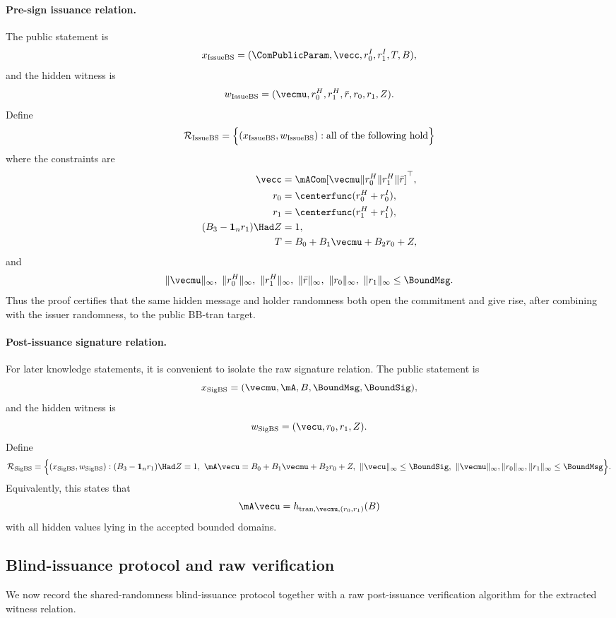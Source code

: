 \paragraph{Pre-sign issuance relation.}
The public statement is
\[
  x_{\mathrm{IssueBS}}=(\ComPublicParam,\vecc,r_0^I,r_1^I,T,B),
\]
and the hidden witness is
\[
  w_{\mathrm{IssueBS}}=(\vecmu,r_0^H,r_1^H,\bar r,r_0,r_1,Z).
\]
Define
\[
  \mathcal R_{\mathrm{IssueBS}}
  =
  \Bigl\{(x_{\mathrm{IssueBS}},w_{\mathrm{IssueBS}}):
  \text{all of the following hold}\Bigr\}
\]
where the constraints are
\begin{align}
  \vecc &= \mACom[\vecmu\Vert r_0^H\Vert r_1^H\Vert \bar r]^\top, \label{eq:issuebs-rel-commit}\\
  r_0 &= \centerfunc(r_0^H+r_0^I), \label{eq:issuebs-rel-center0}\\
  r_1 &= \centerfunc(r_1^H+r_1^I), \label{eq:issuebs-rel-center1}\\
  (B_3-\mathbf 1_n r_1)\Had Z &= 1, \label{eq:issuebs-rel-inverse}\\
  T &= B_0+B_1\vecmu+B_2r_0+Z, \label{eq:issuebs-rel-target}
\end{align}
and
\[
  \|\vecmu\|_\infty,\ \|r_0^H\|_\infty,\ \|r_1^H\|_\infty,\ \|\bar r\|_\infty,\ \|r_0\|_\infty,\ \|r_1\|_\infty
  \le \BoundMsg.
\]
Thus the proof certifies that the same hidden message and holder randomness both open the commitment and
give rise, after combining with the issuer randomness, to the public BB-tran target.

\paragraph{Post-issuance signature relation.}
For later knowledge statements, it is convenient to isolate the raw signature relation.  The public statement is
\[
  x_{\mathrm{SigBS}}=(\vecmu,\mA,B,\BoundMsg,\BoundSig),
\]
and the hidden witness is
\[
  w_{\mathrm{SigBS}}=(\vecu,r_0,r_1,Z).
\]
Define
\[
  \mathcal R_{\mathrm{SigBS}}
  =
  \Bigl\{(x_{\mathrm{SigBS}},w_{\mathrm{SigBS}}):
  (B_3-\mathbf 1_n r_1)\Had Z=1,
  \ \mA\vecu=B_0+B_1\vecmu+B_2r_0+Z,
  \ \|\vecu\|_\infty\le\BoundSig,
  \ \|\vecmu\|_\infty,\|r_0\|_\infty,\|r_1\|_\infty\le\BoundMsg
  \Bigr\}.
\]
Equivalently, this states that
\[
  \mA\vecu=h_{\mathrm{tran},\vecmu,(r_0,r_1)}(B)
\]
with all hidden values lying in the accepted bounded domains.

\subsection{Blind-issuance protocol and raw verification}
\label{subsec:bs-protocol}
We now record the shared-randomness blind-issuance protocol together with a raw post-issuance verification algorithm for the extracted witness relation.

